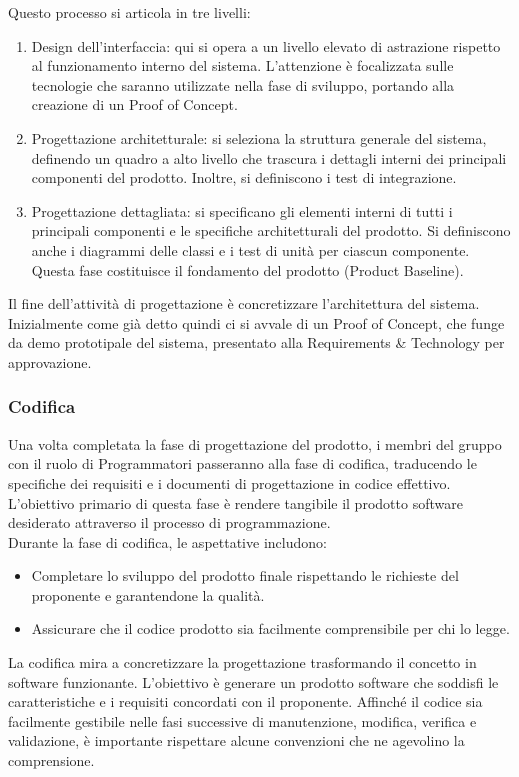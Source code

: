 \documentclass{article}
\begin{document}
Questo processo si articola in tre livelli:

\begin{enumerate}
    \item Design dell'interfaccia: qui si opera a un livello elevato di astrazione rispetto al funzionamento interno del sistema. L'attenzione è focalizzata sulle tecnologie che saranno utilizzate nella fase di sviluppo, portando alla creazione di un Proof of Concept.
    \item Progettazione architetturale: si seleziona la struttura generale del sistema, definendo un quadro a alto livello che trascura i dettagli interni dei principali componenti del prodotto. Inoltre, si definiscono i test di integrazione.
    \item Progettazione dettagliata: si specificano gli elementi interni di tutti i principali componenti e le specifiche architetturali del prodotto. Si definiscono anche i diagrammi delle classi e i test di unità per ciascun componente. Questa fase costituisce il fondamento del prodotto (Product Baseline).
\end{enumerate}
Il fine dell'attività di progettazione è concretizzare l'architettura del sistema. Inizialmente come già detto quindi ci si avvale di un Proof of Concept, che funge da demo prototipale del sistema, presentato alla Requirements \& Technology per approvazione.

\subsubsection{Codifica}
Una volta completata la fase di progettazione del prodotto, i membri del gruppo con il ruolo di Programmatori passeranno alla fase di codifica, traducendo le specifiche dei requisiti e i documenti di progettazione in codice effettivo. L'obiettivo primario di questa fase è rendere tangibile il prodotto software desiderato attraverso il processo di programmazione.\\
Durante la fase di codifica, le aspettative includono:
\begin{itemize}
    \item Completare lo sviluppo del prodotto finale rispettando le richieste del proponente e garantendone la qualità.
    \item Assicurare che il codice prodotto sia facilmente comprensibile per chi lo legge.
\end{itemize}
La codifica mira a concretizzare la progettazione trasformando il concetto in software funzionante. L'obiettivo è generare un prodotto software che soddisfi le caratteristiche e i requisiti concordati con il proponente. Affinché il codice sia facilmente gestibile nelle fasi successive di manutenzione, modifica, verifica e validazione, è importante rispettare alcune convenzioni che ne agevolino la comprensione.
\end{document}

